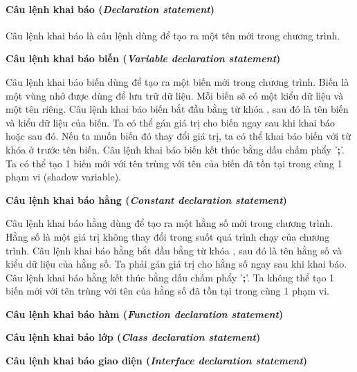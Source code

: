 \paragraph{Câu lệnh khai báo (\textit{Declaration statement})}

\regexdeclstmt

Câu lệnh khai báo là câu lệnh dùng để tạo ra một tên mới trong chương trình. 

\noindent\textbf{Câu lệnh khai báo biến (\textit{Variable declaration statement})}

\regexvardeclstmt

Câu lệnh khai báo biến dùng để tạo ra một biến mới trong chương trình. Biến là một vùng nhớ được dùng để lưu trữ dữ liệu. Mỗi biến sẽ có một kiểu dữ liệu và một tên riêng. Câu lệnh khai báo biến bắt đầu bằng từ khóa , sau đó là tên biến và kiểu dữ liệu của biến. Ta có thể gán giá trị cho biến ngay sau khi khai báo hoặc sau đó. Nếu ta muốn biến đó thay đổi giá trị, ta có thể khai báo biến với từ khóa  ở trước tên biến. Câu lệnh khai báo biến kết thúc bằng dấu chấm phẩy '\textbf{;}'. Ta có thể tạo 1 biến mới với tên trùng với tên của biến đã tồn tại trong cùng 1 phạm vi (shadow variable).

\noindent\textbf{Câu lệnh khai báo hằng (\textit{Constant declaration statement})}

\regexconstdeclstmt

Câu lệnh khai báo hằng dùng để tạo ra một hằng số mới trong chương trình. Hằng số là một giá trị không thay đổi trong suốt quá trình chạy của chương trình. Câu lệnh khai báo hằng bắt đầu bằng từ khóa , sau đó là tên hằng số và kiểu dữ liệu của hằng số. Ta phải gán giá trị cho hằng số ngay sau khi khai báo. Câu lệnh khai báo hằng kết thúc bằng dấu chấm phẩy '\textbf{;}'. Ta không thể tạo 1 biến mới với tên trùng với tên của hằng số đã tồn tại trong cùng 1 phạm vi.

\noindent\textbf{Câu lệnh khai báo hàm (\textit{Function declaration statement})}

\noindent\textbf{Câu lệnh khai báo lớp (\textit{Class declaration statement})}

\noindent\textbf{Câu lệnh khai báo giao diện (\textit{Interface declaration statement})}
